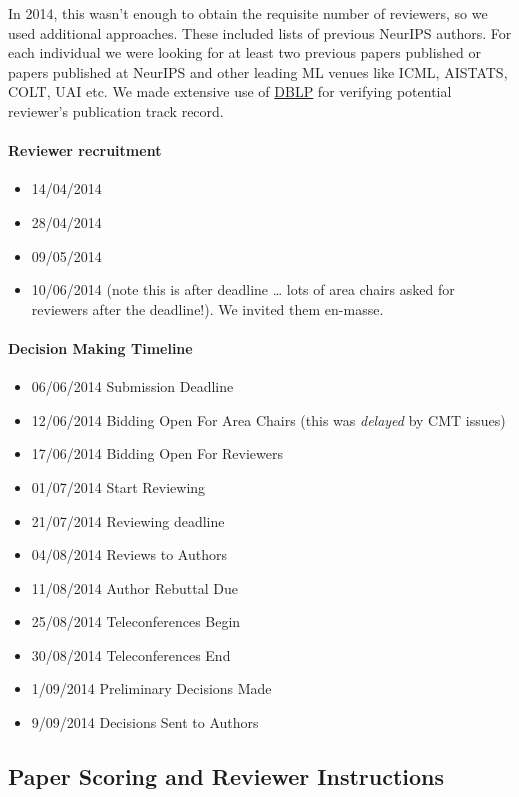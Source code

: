 In 2014, this wasn't enough to obtain the requisite number of reviewers,
so we used additional approaches. These included lists of previous
NeurIPS authors. For each individual we were looking for at least two
previous papers published or papers published at NeurIPS and other
leading ML venues like ICML, AISTATS, COLT, UAI etc. We made extensive
use of \href{https://dblp.uni-trier.de/}{DBLP} for verifying potential
reviewer's publication track record.

\paragraph{Reviewer recruitment}

\begin{itemize}
\tightlist
\item
  14/04/2014
\item
  28/04/2014
\item
  09/05/2014
\item
  10/06/2014 (note this is after deadline \ldots{} lots of area chairs
  asked for reviewers after the deadline!). We invited them en-masse.
\end{itemize}

\paragraph{Decision Making Timeline}

\begin{itemize}
\tightlist
\item
  06/06/2014 Submission Deadline
\item
  12/06/2014 Bidding Open For Area Chairs (this was \emph{delayed} by
  CMT issues)
\item
  17/06/2014 Bidding Open For Reviewers
\item
  01/07/2014 Start Reviewing
\item
  21/07/2014 Reviewing deadline
\item
  04/08/2014 Reviews to Authors
\item
  11/08/2014 Author Rebuttal Due
\item
  25/08/2014 Teleconferences Begin
\item
  30/08/2014 Teleconferences End
\item
  1/09/2014 Preliminary Decisions Made
\item
  9/09/2014 Decisions Sent to Authors
\end{itemize}

\hypertarget{paper-scoring-and-reviewer-instructions}{%
\subsection{Paper Scoring and Reviewer
Instructions}\label{paper-scoring-and-reviewer-instructions}}

